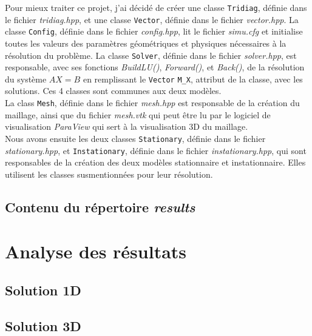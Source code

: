 \documentclass[12pt,a4paper]{article}
\begin{document}
	
Pour mieux traiter ce projet, j'ai décidé de créer une classe \texttt{Tridiag}, définie dans le fichier \textit{tridiag.hpp}, et une classe \texttt{Vector}, définie dans le fichier \textit{vector.hpp}.
La classe \texttt{Config}, définie dans le fichier \textit{config.hpp}, lit le fichier \textit{simu.cfg} et initialise toutes les valeurs des paramètres géométriques et physiques nécessaires à la résolution du problème.
La classe \texttt{Solver}, définie dans le fichier \textit{solver.hpp}, est responsable, avec ses fonctions \textit{BuildLU()}, \textit{Forward()}, et \textit{Back()},
de la résolution du système $AX=B$ en remplissant le \texttt{Vector} \texttt{M\_X}, attribut de la classe, avec les solutions.
Ces 4 classes sont communes aux deux modèles.\\

La class \texttt{Mesh}, définie dans le fichier \textit{mesh.hpp} est responsable de la création du maillage, ainsi que du fichier \textit{mesh.vtk}
qui peut être lu par le logiciel de visualisation \textit{ParaView} qui sert à la visualisation 3D du maillage.\\

Nous avons ensuite les deux classes \texttt{Stationary}, définie dans le fichier \textit{stationary.hpp}, et \texttt{Instationary}, définie dans le fichier \textit{instationary.hpp},
qui sont responsables de la création des deux modèles stationnaire et instationnaire.
Elles utilisent les classes susmentionnées pour leur résolution.

	\subsection{Contenu du répertoire \textit{results}}

	\section{Analyse des résultats}

	\subsection{Solution 1D}

	\subsection{Solution 3D}


	
\end{document}
